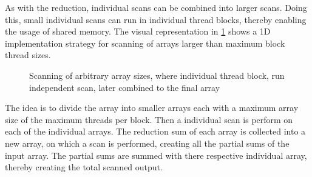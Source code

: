 As with the reduction, individual scans can be combined into larger scans. Doing this, small individual scans can run in individual thread blocks, thereby enabling the usage of shared memory. The visual representation in \cref{fig:scan_blocking} shows a 1D implementation strategy for scanning of arrays larger than maximum block thread sizes.

\begin{figure}[ht]
	\centering
	\caption{Scanning of arbitrary array sizes, where individual thread block, run independent scan, later combined to the final array}
	\label{fig:scan_blocking}
\end{figure}

The idea is to divide the array into smaller arrays each with a maximum array size of the maximum threads per block. Then a individual scan is perform on each of the individual arrays. The reduction sum of each array is collected into a new array, on which a scan is performed, creating all the partial sums of the input array. The partial sums are summed with there respective individual array, thereby creating the total scanned output. 